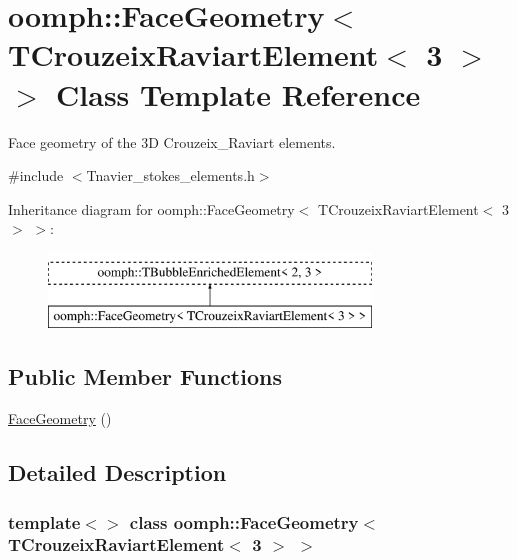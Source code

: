 \hypertarget{classoomph_1_1FaceGeometry_3_01TCrouzeixRaviartElement_3_013_01_4_01_4}{}\section{oomph\+:\+:Face\+Geometry$<$ T\+Crouzeix\+Raviart\+Element$<$ 3 $>$ $>$ Class Template Reference}
\label{classoomph_1_1FaceGeometry_3_01TCrouzeixRaviartElement_3_013_01_4_01_4}


Face geometry of the 3D Crouzeix\+\_\+\+Raviart elements.  




{\ttfamily \#include $<$Tnavier\+\_\+stokes\+\_\+elements.\+h$>$}

Inheritance diagram for oomph\+:\+:Face\+Geometry$<$ T\+Crouzeix\+Raviart\+Element$<$ 3 $>$ $>$\+:\begin{figure}[H]
\begin{center}
\leavevmode
\includegraphics[height=2.000000cm]{classoomph_1_1FaceGeometry_3_01TCrouzeixRaviartElement_3_013_01_4_01_4}
\end{center}
\end{figure}
\subsection*{Public Member Functions}
\begin{DoxyCompactItemize}
\item 
\hyperlink{classoomph_1_1FaceGeometry_3_01TCrouzeixRaviartElement_3_013_01_4_01_4_a471c39f7b8167933076a8db632686326}{Face\+Geometry} ()
\end{DoxyCompactItemize}


\subsection{Detailed Description}
\subsubsection*{template$<$$>$\newline
class oomph\+::\+Face\+Geometry$<$ T\+Crouzeix\+Raviart\+Element$<$ 3 $>$ $>$}

